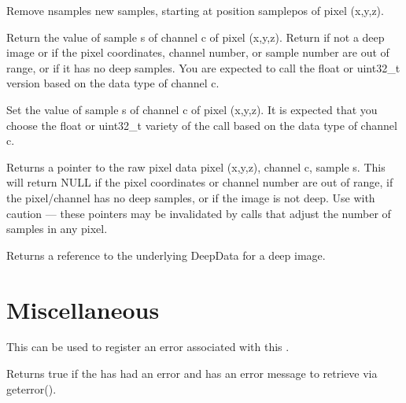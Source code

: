 \NEW %
Remove {\cf nsamples} new samples, starting at position {\cf samplepos} of
pixel {\cf (x,y,z)}.
\apiend

Return the value of sample {\cf s} of channel {\cf c}
of pixel {\cf (x,y,z)}.  Return {} if not a deep image or if the
pixel coordinates, channel number, or sample number are out of range, or
if it has no deep samples.  You are expected to call the {\cf float} or
{\cf uint32_t} version based on the data type of channel {\cf c}.
\apiend

Set the value of sample {\cf s} of channel {\cf c}
of pixel {\cf (x,y,z)}. It is expected that you choose the {\cf float}
or {\cf uint32_t} variety of the call based on the data type of channel {\cf c}.
\apiend

Returns a pointer to the raw pixel data pixel {\cf (x,y,z)}, channel {\cf c},
sample {\cf s}.  This will return {\cf NULL} if the pixel
coordinates or channel number are out of range, if the pixel/channel has
no deep samples, or if the image is not deep. Use with caution --- these
pointers may be invalidated by calls that adjust the number of samples in
any pixel.
\apiend

Returns a reference to the underlying {\cf DeepData} for a deep image.
\apiend


\section{Miscellaneous}

This can be used to register an error associated with this \ImageBuf.
\apiend

Returns {\cf true} if the \ImageBuf has had an error and has an error
message to retrieve via {\cf geterror()}.
\apiend

